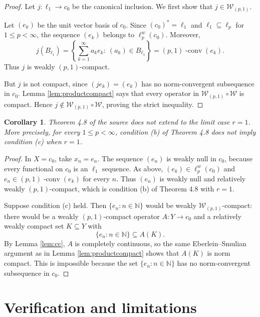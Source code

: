 \documentclass[11pt]{article}
\newtheorem{corollary}{Corollary}
\newcommand{\N}{\mathbb N}
\begin{document}
\begin{proof}
Let $j:\ell_1\to c_0$ be the canonical inclusion.  We first show that
$j\in\mathcal W_{(p,1)}$.

Let $(e_k)$ be the unit vector basis of $c_0$.  Since $(c_0)^\ast=\ell_1$
and $\ell_1\subseteq \ell_p$ for $1\le p<\infty$, the sequence
$(e_k)$ belongs to $\ell_p^w(c_0)$.  Moreover,
\[
   j(B_{\ell_1})
   =
   \left\{\sum_{k=1}^\infty a_ke_k:\ (a_k)\in B_{\ell_1}\right\}
   =
   (p,1)\operatorname{-conv}(e_k).
\]
Thus $j$ is weakly $(p,1)$-compact.

But $j$ is not compact, since $(j e_k)=(e_k)$ has no norm-convergent
subsequence in $c_0$.  Lemma \ref{lem:productcompact} says that every
operator in $\mathcal W_{(p,1)}\circ\mathcal W$ is compact.  Hence
$j\notin \mathcal W_{(p,1)}\circ\mathcal W$, proving the strict
inequality.
\end{proof}

\begin{corollary}\label{cor:thm48fails}
Theorem 4.8 of the source does not extend to the limit case $r=1$.
More precisely, for every $1\le p<\infty$, condition (b) of Theorem
4.8 does not imply condition (c) when $r=1$.
\end{corollary}

\begin{proof}
In $X=c_0$, take $x_n=e_n$.  The sequence $(e_n)$ is weakly null in
$c_0$, because every functional on $c_0$ is an $\ell_1$ sequence.
As above, $(e_k)\in\ell_p^w(c_0)$ and
$e_n\in (p,1)\operatorname{-conv}(e_k)$ for every $n$.  Thus
$(e_n)$ is weakly null and relatively weakly $(p,1)$-compact, which is
condition (b) of Theorem 4.8 with $r=1$.

Suppose condition (c) held.  Then $\{e_n:n\in\N\}$ would be weakly
$\mathcal W_{(p,1)}$-compact: there would be a weakly $(p,1)$-compact
operator $A:Y\to c_0$ and a relatively weakly compact set
$K\subseteq Y$ with
\[
   \{e_n:n\in\N\}\subseteq A(K).
\]
By Lemma \ref{lem:cc}, $A$ is completely continuous, so the same
Eberlein--Smulian argument as in Lemma \ref{lem:productcompact} shows
that $A(K)$ is norm compact.  This is impossible because the set
$\{e_n:n\in\N\}$ has no norm-convergent subsequence in $c_0$.
\end{proof}

\section*{Verification and limitations}
\end{document}
